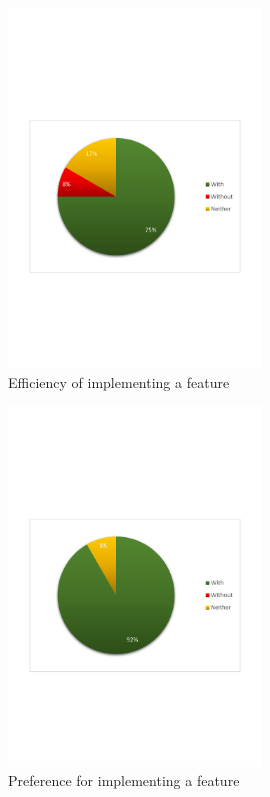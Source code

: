 \begin{figure}[H]
  \centering
    \includegraphics[width=0.6\textwidth]{images/charts/implementing_efficient.pdf}
	\caption[Efficiency of implementing]{Efficiency of implementing a feature}
	\label{fig:implementing_efficient}
\end{figure}

\begin{figure}[H]
  \centering
    \includegraphics[width=0.6\textwidth]{images/charts/prefer_implementing.pdf}
	\caption[Preference for implementing]{Preference for implementing a feature}
	\label{fig:prefer_implementing}
\end{figure}

